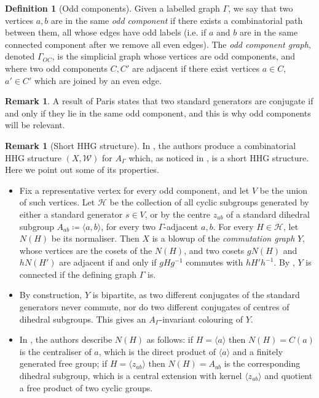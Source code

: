 \documentclass[svgnames]{amsart}
\theoremstyle{plain}
\theoremstyle{definition}
\newtheorem{defn}[thm]{Definition}
\newtheorem{rem}[thm]{Remark}
\newcommand{\W}{\mathcal{W}}
\begin{document}
\begin{defn}[Odd components]
Given a labelled graph $\Gamma$, we say that two vertices $a,b$ are in the same \emph{odd component} if there exists a combinatorial path between them, all whose edges have odd labels (i.e. if $a$ and $b$ are in the same connected component after we remove all even edges). The \emph{odd component graph}, denoted $\Gamma_{OC}$, is the simplicial graph whose vertices are odd components, and where two odd components $C,C'$ are adjacent if there exist vertices $a\in C$, $a'\in C'$ which are joined by an even edge.
\end{defn}

\begin{rem}
    A result of Paris \cite[Corollary 4.2]{paris_artin_groups} states that two standard generators are conjugate if and only if they lie in the same odd component, and this is why odd components will be relevant.
\end{rem}

\begin{rem}[Short HHG structure]\label{rem:example_Artingroup}
In \cite{ELTAG_HHS}, the authors produce a combinatorial HHG structure $(X,\W)$ for $A_\Gamma$ which, as noticed in \cite{Short_HHG:I}, is a short HHG structure. Here we point out some of its properties.
\begin{itemize}
    \item Fix a representative vertex for every odd component, and let $V$ be the union of such vertices. Let $\mathcal H$ be the collection of all cyclic subgroups generated by either a standard generator $s\in V$, or by the centre $z_{ab}$ of a standard dihedral subgroup $A_{ab}\coloneq\langle a, b\rangle$, for every two $\Gamma$-adjacent $a,b$. For every $H\in \mathcal H$, let $N(H)$ be its normaliser. Then $X$ is a blowup of the \emph{commutation graph} $Y$, whose vertices are the cosets of the $N(H)$, and two cosets $gN(H)$ and $hN(H')$ are adjacent if and only if $gHg^{-1}$ commutes with $hH'h^{-1}$. By \cite[Lemma 3.10]{ELTAG_HHS}, $Y$ is connected if the defining graph $\Gamma$ is. 
    \item By construction, $Y$ is bipartite, as two different conjugates of the standard generators never commute, nor do two different conjugates of centres of dihedral subgroups. This gives an $A_\Gamma$-invariant colouring of $Y$.
    \item In \cite[Lemmas 2.27 and 2.28]{ELTAG_HHS}, the authors describe $N(H)$ as follows: if $H=\langle a\rangle$ then $N(H)=C(a)$ is the centraliser of $a$, which is the direct product of $\langle a\rangle$ and a finitely generated free group; if $H=\langle z_{ab}\rangle$ then $N(H)=A_{ab}$ is the corresponding dihedral subgroup, which is a central extension with kernel $\langle z_{ab}\rangle$ and quotient a free product of two cyclic groups.
\end{itemize}
\end{rem}
\end{document}
